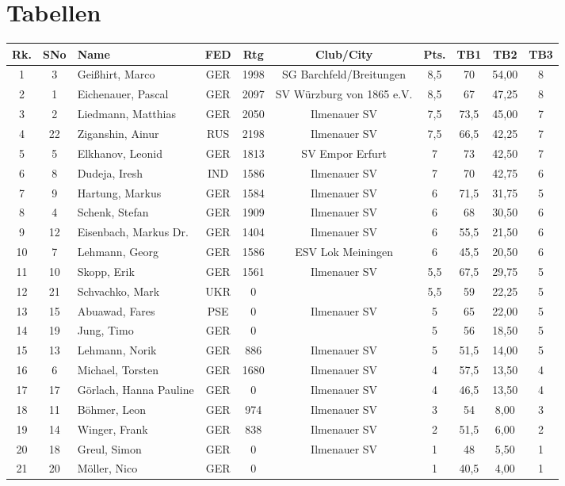 \documentclass[a4paper,ngerman]{tui-algo-seminar}
\begin{document}
\section{Tabellen}
	\begin{center}
	\begin{tabular}{|c|c|l|c|c|c|c|c|c|c|}
		\hline
		\textbf{Rk.} & \textbf{SNo} & \textbf{Name} & \textbf{FED} & \textbf{Rtg} & \textbf{Club/City} & \textbf{Pts.} & \textbf{TB1} & \textbf{TB2} & \textbf{TB3} \\
		\hline
		1 & 3 & Geißhirt, Marco & GER & 1998 & SG Barchfeld/Breitungen & 8,5 & 70 & 54,00 & 8 \\
		2 & 1 & Eichenauer, Pascal & GER & 2097 & SV Würzburg von 1865 e.V. & 8,5 & 67 & 47,25 & 8 \\
		3 & 2 & Liedmann, Matthias & GER & 2050 & Ilmenauer SV & 7,5 & 73,5 & 45,00 & 7 \\
		4 & 22 & Ziganshin, Ainur & RUS & 2198 & Ilmenauer SV & 7,5 & 66,5 & 42,25 & 7 \\
		5 & 5 & Elkhanov, Leonid & GER & 1813 & SV Empor Erfurt & 7 & 73 & 42,50 & 7 \\
		6 & 8 & Dudeja, Iresh & IND & 1586 & Ilmenauer SV & 7 & 70 & 42,75 & 6 \\
		7 & 9 & Hartung, Markus & GER & 1584 & Ilmenauer SV & 6 & 71,5 & 31,75 & 5 \\
		8 & 4 & Schenk, Stefan & GER & 1909 & Ilmenauer SV & 6 & 68 & 30,50 & 6 \\
		9 & 12 & Eisenbach, Markus Dr. & GER & 1404 & Ilmenauer SV & 6 & 55,5 & 21,50 & 6 \\
		10 & 7 & Lehmann, Georg & GER & 1586 & ESV Lok Meiningen & 6 & 45,5 & 20,50 & 6 \\
		11 & 10 & Skopp, Erik & GER & 1561 & Ilmenauer SV & 5,5 & 67,5 & 29,75 & 5 \\
		12 & 21 & Schvachko, Mark & UKR & 0 & & 5,5 & 59 & 22,25 & 5 \\
		13 & 15 & Abuawad, Fares & PSE & 0 & Ilmenauer SV & 5 & 65 & 22,00 & 5 \\
		14 & 19 & Jung, Timo & GER & 0 & & 5 & 56 & 18,50 & 5 \\
		15 & 13 & Lehmann, Norik & GER & 886 & Ilmenauer SV & 5 & 51,5 & 14,00 & 5 \\
		16 & 6 & Michael, Torsten & GER & 1680 & Ilmenauer SV & 4 & 57,5 & 13,50 & 4 \\
		17 & 17 & Görlach, Hanna Pauline & GER & 0 & Ilmenauer SV & 4 & 46,5 & 13,50 & 4 \\
		18 & 11 & Böhmer, Leon & GER & 974 & Ilmenauer SV & 3 & 54 & 8,00 & 3 \\
		19 & 14 & Winger, Frank & GER & 838 & Ilmenauer SV & 2 & 51,5 & 6,00 & 2 \\
		20 & 18 & Greul, Simon & GER & 0 & Ilmenauer SV & 1 & 48 & 5,50 & 1 \\
		21 & 20 & Möller, Nico & GER & 0 & & 1 & 40,5 & 4,00 & 1 \\
		\hline
	\end{tabular}
\end{center}
\end{document}
